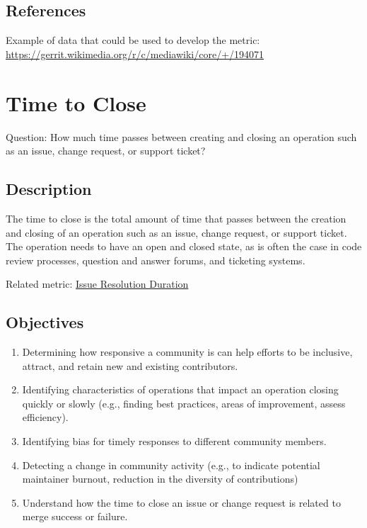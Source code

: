 \documentclass[
  12pt,
]{article}
\providecommand{\tightlist}{%
  \setlength{\itemsep}{0pt}\setlength{\parskip}{0pt}}
\begin{document}
\hypertarget{references-4}{%
\subsection{References}\label{references-4}}

Example of data that could be used to develop the metric:
\url{https://gerrit.wikimedia.org/r/c/mediawiki/core/+/194071}

\hypertarget{time-to-close}{%
\section{Time to Close}\label{time-to-close}}

Question: How much time passes between creating and closing an operation
such as an issue, change request, or support ticket?

\hypertarget{description-5}{%
\subsection{Description}\label{description-5}}

The time to close is the total amount of time that passes between the
creation and closing of an operation such as an issue, change request,
or support ticket. The operation needs to have an open and closed state,
as is often the case in code review processes, question and answer
forums, and ticketing systems.

Related metric:
\href{https://chaoss.community/metric-issue-resolution-duration/}{Issue
Resolution Duration}

\hypertarget{objectives-5}{%
\subsection{Objectives}\label{objectives-5}}

\begin{enumerate}
\tightlist
\item
  Determining how responsive a community is can help efforts to be
  inclusive, attract, and retain new and existing contributors.\\
\item
  Identifying characteristics of operations that impact an operation
  closing quickly or slowly (e.g., finding best practices, areas of
  improvement, assess efficiency).\\
\item
  Identifying bias for timely responses to different community
  members.\\
\item
  Detecting a change in community activity (e.g., to indicate potential
  maintainer burnout, reduction in the diversity of contributions)\\
\item
  Understand how the time to close an issue or change request is related
  to merge success or failure.
\end{enumerate}
\end{document}

